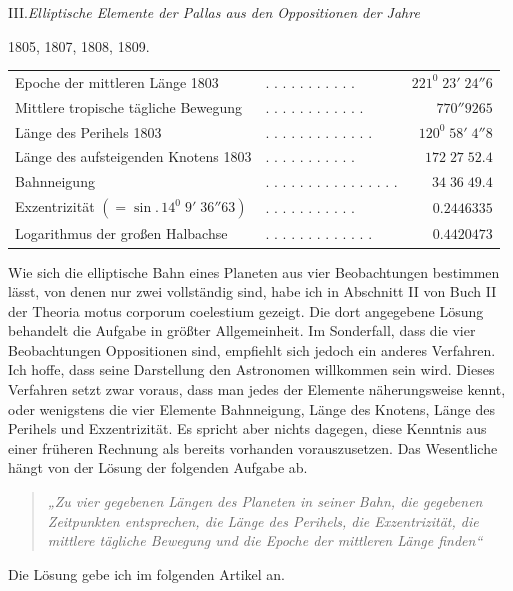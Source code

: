 \begin{center}III.\quad\textit{Elliptische Elemente der Pallas aus den Oppositionen der Jahre}\par
1805, 1807, 1808, 1809.\end{center}
\begingroup\small\setlength{\tabcolsep}{2pt}
\noindent\begin{tabular}{@{}p{.51\linewidth}lr@{}}
Epoche der mittleren Länge 1803&. . . . . . . . . . .&$221^0\;23'\;24''6$\\
Mittlere tropische tägliche Bewegung&. . . . . . . . . . . .&$770''9265$\\
Länge des Perihels 1803&. . . . . . . . . . . . .&$120^0\;58'\;4''8$\\
Länge des aufsteigenden Knotens 1803&. . . . . . . . . . .&$172\;27\;52.4$\\
Bahnneigung&. . . . . . . . . . . . . . . .&$34\;36\;49.4$\\
Exzentrizität $(=\sin.\,14^0\;9'\;36''63)$&. . . . . . . . . . .&$0.2446335$\\
Logarithmus der großen Halbachse&. . . . . . . . . . . . .&$0.4420473$
\end{tabular}\par\endgroup
{}
Wie sich die elliptische Bahn eines Planeten aus vier Beobachtungen bestimmen lässt, von denen nur zwei vollständig sind, habe ich in Abschnitt II von Buch II der Theoria motus corporum coelestium gezeigt. Die dort angegebene Lösung behandelt die Aufgabe in größter Allgemeinheit. Im Sonderfall, dass die vier Beobachtungen Oppositionen sind, empfiehlt sich jedoch ein anderes Verfahren. Ich hoffe, dass seine Darstellung den Astronomen willkommen sein wird. Dieses Verfahren setzt zwar voraus, dass man jedes der Elemente näherungsweise kennt, oder wenigstens die vier Elemente Bahnneigung, Länge des Knotens, Länge des Perihels und Exzentrizität. Es spricht aber nichts dagegen, diese Kenntnis aus einer früheren Rechnung als bereits vorhanden vorauszusetzen. Das Wesentliche hängt von der Lösung der folgenden Aufgabe ab.
\begin{quote}\itshape
„Zu vier gegebenen Längen des Planeten in seiner Bahn, die gegebenen Zeitpunkten entsprechen, die Länge des Perihels, die Exzentrizität, die mittlere tägliche Bewegung und die Epoche der mittleren Länge finden“
\end{quote}
Die Lösung gebe ich im folgenden Artikel an.
